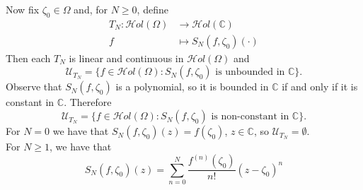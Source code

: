 \documentclass[11pt,twoside,a4paper]{article}
\theoremstyle{remark}
\newcommand{\hol}{{\mathcal Hol}}
\newcommand{\holo}{{\mathcal Hol}(\Omega)}
\begin{document}
Now fix $\zeta_0 \in \Omega$ and, for $N \geq 0$, define
\begin{align*}
  T_N: \holo & \rightarrow \hol(\mathbb{C}) \\
  f & \mapsto S_N(f,\zeta_0)(\cdot)
\end{align*}
Then each $T_N$ is linear and continuous in $\holo$ and
\begin{equation*}
  \mathcal{U}_{T_N} = \big\{ f \in \holo: S_N(f, \zeta_0) \text{ is unbounded in } \mathbb{C}\big\}.
\end{equation*}
Observe that $S_N(f, \zeta_0)$ is a polynomial, so it is bounded in $\mathbb{C}$ if and only if it is constant in $\mathbb{C}$. Therefore
\begin{equation*}
  \mathcal{U}_{T_N} = \big\{ f \in \holo: S_N(f, \zeta_0) \text{ is non-constant in } \mathbb{C}\big\}.
\end{equation*}
For $N=0$ we have that $S_N(f,\zeta_0)(z)= f(\zeta_0)$, $z \in \mathbb{C}$, so $\mathcal{U}_{T_N}= \emptyset$. \\
For $N \geq 1$, we have that
\begin{equation*}
  S_N(f,\zeta_0)(z)= \sum_{n=0}^{N}\frac{f^{(n)}(\zeta_0)}{n!}(z- \zeta_0)^n
\end{equation*}
\end{document}
